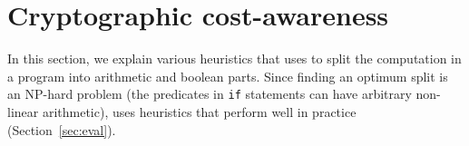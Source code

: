 
\section{Cryptographic cost-awareness}
 \label{sec:ccc}
In this section, we explain various heuristics that \tool uses to split
the computation in a program into arithmetic and
boolean parts. Since finding an optimum split  is an NP-hard problem (the predicates in {\tt if} statements can have arbitrary non-linear arithmetic),
\tool uses heuristics  that  perform well in practice (Section~\ref{sec:eval}).

